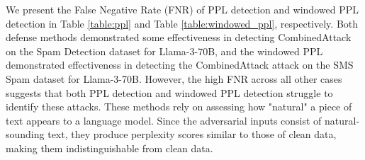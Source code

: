 \documentclass[11pt]{article}
\begin{document}
\begin{table}[ht!]
\centering
{}
\caption{False Negative Rate (\%) at a 1\% False Positive Rate for Windowed-PPL-Based Detection}
\label{table:windowed_ppl}
\end{table}

We present the False Negative Rate (FNR) of PPL detection and windowed PPL detection in Table \ref{table:ppl} and Table \ref{table:windowed_ppl}, respectively. Both defense methods demonstrated some effectiveness in detecting CombinedAttack on the Spam Detection dataset for Llama-3-70B, and the windowed PPL demonstrated effectiveness in detecting the CombinedAttack attack on the SMS Spam dataset for Llama-3-70B. However, the high FNR across all other cases suggests that both PPL detection and windowed PPL detection struggle to identify these attacks. These methods rely on assessing how "natural" a piece of text appears to a language model. Since the adversarial inputs consist of natural-sounding text, they produce perplexity scores similar to those of clean data, making them indistinguishable from clean data.
\end{document}
